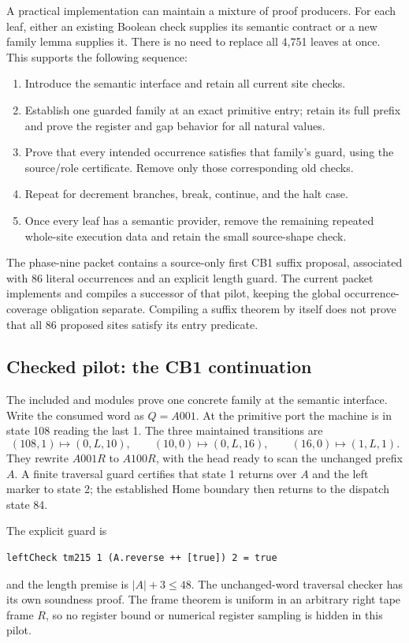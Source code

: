 \documentclass[11pt,letterpaper]{article}
\newcommand{\code}[1]{\texttt{\small\detokenize{#1}}}
\theoremstyle{definition}\newtheorem{definition}[theorem]{Definition}
\begin{document}
A practical implementation can maintain a mixture of proof producers. For
each leaf, either an existing Boolean check supplies its semantic contract or
a new family lemma supplies it. There is no need to replace all 4,751 leaves
at once. This supports the following sequence:
\begin{enumerate}
\item Introduce the semantic interface and retain all current site checks.
\item Establish one guarded family at an exact primitive entry; retain its
full prefix and prove the register and gap behavior for all natural values.
\item Prove that every intended occurrence satisfies that family's guard,
using the source/role certificate. Remove only those corresponding old checks.
\item Repeat for decrement branches, break, continue, and the halt case.
\item Once every leaf has a semantic provider, remove the remaining repeated
whole-site execution data and retain the small source-shape check.
\end{enumerate}

The phase-nine packet contains a source-only first CB1 suffix proposal,
associated with 86 literal occurrences and an explicit length guard.
The current packet implements and compiles a successor of that pilot, keeping
the global occurrence-coverage obligation separate. Compiling a suffix theorem
by itself does not prove that all 86 proposed sites satisfy its entry predicate.

\subsection{Checked pilot: the CB1 continuation}

The included \code{KCB1Suffix} and \code{KCB1Contract} modules prove one
concrete family at the semantic interface. Write the consumed word as
\(Q=A001\). At the primitive port the machine is in state 108 reading the
last 1. The three maintained transitions are
\[
 (108,1)\mapsto(0,L,10),\qquad
 (10,0)\mapsto(0,L,16),\qquad
 (16,0)\mapsto(1,L,1).
\]
They rewrite \(A001R\) to \(A100R\), with the head ready to scan the
unchanged prefix \(A\). A finite traversal guard certifies that state 1
returns over \(A\) and the left marker to state 2; the established Home
boundary then returns to the dispatch state 84.

The explicit guard is
\begin{lstlisting}
leftCheck tm215 1 (A.reverse ++ [true]) 2 = true
\end{lstlisting}
and the length premise is \(|A|+3\le48\). The unchanged-word traversal
checker has its own soundness proof. The frame theorem is uniform in an
arbitrary right tape frame \(R\), so no register bound or numerical register
sampling is hidden in this pilot.
\end{document}
